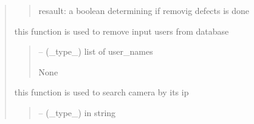 \documentclass[letterpaper,10pt,english]{sphinxmanual}
\begin{document}
\begin{quote}
\begin{savenotes}
\begin{fulllineitems}
\begin{savenotes}
\begin{fulllineitems}
\begin{quote}
\begin{description}
\sphinxAtStartPar
resault: a boolean determining if removig defects is done

\end{description}\end{quote}

\end{fulllineitems}\end{savenotes}


\begin{savenotes}\begin{fulllineitems}
\label{\detokenize{setting/database_utils:oxin.database_utils.dataBaseUtils.remove_users}}
\pysigstartsignatures
{}
\pysigstopsignatures
\sphinxAtStartPar
this function is used to remove input users from database
\begin{quote}\begin{description}
\sphinxAtStartPar
{} – (\_type\_) list of user\_names

\sphinxAtStartPar
None

\end{description}\end{quote}

\end{fulllineitems}\end{savenotes}


\begin{savenotes}\begin{fulllineitems}
\label{\detokenize{setting/database_utils:oxin.database_utils.dataBaseUtils.search_camera_by_ip}}
\pysigstartsignatures
{}
\pysigstopsignatures
\sphinxAtStartPar
this function is used to search camera by its ip
\begin{quote}\begin{description}
\sphinxAtStartPar
{} – (\_type\_) in string


\end{description}
\end{quote}
\end{fulllineitems}
\end{savenotes}
\end{fulllineitems}
\end{savenotes}
\end{quote}
\end{document}
